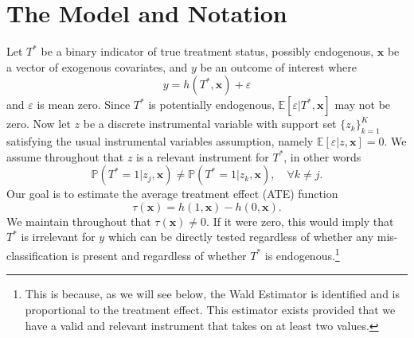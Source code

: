 \section{The Model and Notation}
Let $T^*$ be a binary indicator of true treatment status, possibly endogenous, $\mathbf{x}$ be a vector of exogenous covariates, and $y$ be an outcome of interest where
\begin{equation}
  y = h(T^*, \mathbf{x}) + \varepsilon
  \label{eq:model2}
\end{equation}
and $\varepsilon$ is mean zero.
Since $T^*$ is potentially endogenous, $\mathbb{E}[\varepsilon|T^*,\mathbf{x}]$ may not be zero.
Now let $z$ be a discrete instrumental variable with support set $\{z_k\}_{k=1}^K$ satisfying the usual instrumental variables assumption, namely $\mathbb{E}[\varepsilon|z,\mathbf{x}]=0$.
We assume throughout that $z$ is a relevant instrument for $T^*$, in other words 
\begin{equation}
\mathbb{P}(T^*=1|z_j,\mathbf{x})\neq \mathbb{P}(T^*=1|z_k,\mathbf{x}), \quad \forall k\neq j.
\label{eq:relevance}
\end{equation}
Our goal is to estimate the average treatment effect (ATE) function
\begin{equation}
  \tau(\mathbf{x}) = h(1,\mathbf{x}) - h(0,\mathbf{x}).
  \label{eq:ATE2}
\end{equation}
We maintain throughout that $\tau(\mathbf{x}) \neq 0$.
If it were zero, this would imply that $T^*$ is irrelevant for $y$ which can be directly tested regardless of whether any mis-classification is present and regardless of whether $T^*$ is endogenous.\footnote{This is because, as we will see below, the Wald Estimator is identified and is proportional to the treatment effect. This estimator exists provided that we have a valid and relevant instrument that takes on at least two values.} 

